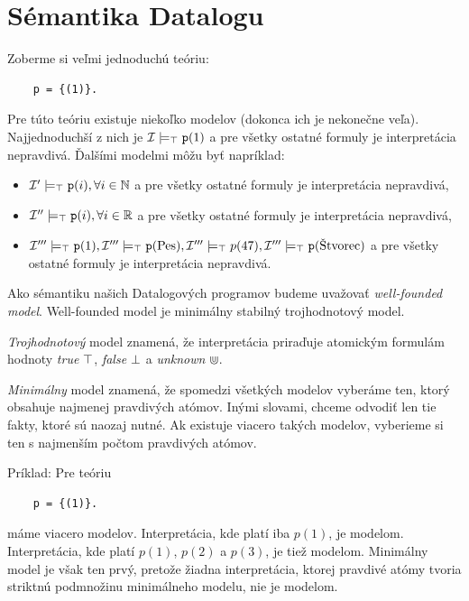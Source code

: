 \section{Sémantika Datalogu}
Zoberme si veľmi jednoduchú teóriu: 
\begin{verbatim}
    p = {(1)}.    
\end{verbatim}

Pre túto teóriu existuje niekoľko modelov (dokonca ich je nekonečne veľa). Najjednoduchší z nich je
$\inter \models_\true \verb|p|(1)$ a pre všetky ostatné formuly je interpretácia nepravdivá. Ďalšími
modelmi môžu byť napríklad:
\begin{itemize}
\item $\inter' \models_\true \verb|p|(i), \forall i \in \mathbb{N}$ a pre všetky ostatné formuly je
interpretácia nepravdivá,
\item $\inter'' \models_\true \verb|p|(i), \forall i \in \mathbb{R}$ a pre všetky ostatné formuly je
interpretácia nepravdivá,
\item $\inter''' \models_\true \verb|p|(1), \inter''' \models_\true \verb|p|(\text{Pes}), \inter'''
\models_\true p(47), \inter''' \models_\true \verb|p|(\text{Štvorec})$ a pre všetky ostatné formuly
je interpretácia nepravdivá.
\end{itemize}

Ako sémantiku našich Datalogových programov budeme uvažovať \textit{well-founded model}.
Well-founded model je minimálny stabilný trojhodnotový model.

\vline

\textit{Trojhodnotový} model znamená, že interpretácia priraďuje atomickým formulám hodnoty
\textit{true} $\top$, \textit{false} $\bot$ a \textit{unknown} $\Cup$.

\vline

\textit{Minimálny} model znamená, že spomedzi všetkých modelov vyberáme ten, ktorý obsahuje najmenej
pravdivých atómov. Inými slovami, chceme odvodiť len tie fakty, ktoré sú naozaj nutné. Ak existuje
viacero takých modelov, vyberieme si ten s najmenším počtom pravdivých atómov.

Príklad: Pre teóriu
\begin{verbatim}
    p = {(1)}.
\end{verbatim}
máme viacero modelov. Interpretácia, kde platí iba $p(1)$, je modelom. Interpretácia, kde platí $p(1)$,
$p(2)$ a $p(3)$, je tiež modelom. Minimálny model je však ten prvý, pretože žiadna interpretácia,
ktorej pravdivé atómy tvoria striktnú podmnožinu minimálneho modelu, nie je modelom.

